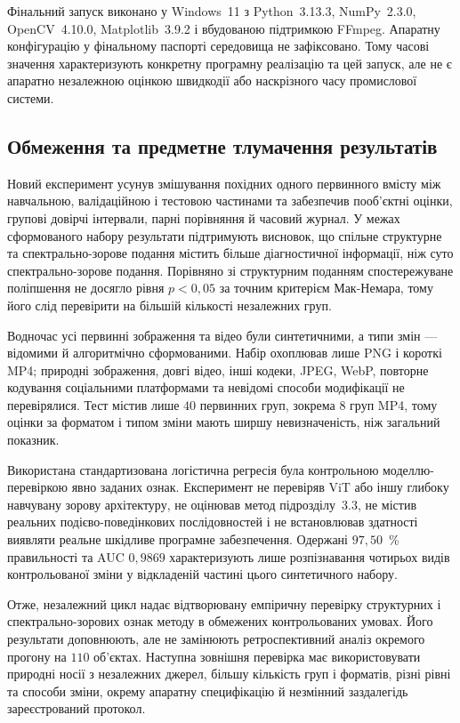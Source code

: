 Фінальний запуск виконано у Windows~11 з Python~3.13.3, NumPy~2.3.0, OpenCV~4.10.0, Matplotlib~3.9.2 і вбудованою підтримкою FFmpeg. Апаратну конфігурацію у фінальному паспорті середовища не зафіксовано. Тому часові значення характеризують конкретну програмну реалізацію та цей запуск, але не є апаратно незалежною оцінкою швидкодії або наскрізного часу промислової системи.

\subsection{Обмеження та предметне тлумачення результатів}
\label{subsec:ch4_ind_svs_limits}

Новий експеримент усунув змішування похідних одного первинного вмісту між навчальною, валідаційною і тестовою частинами та забезпечив пооб'єктні оцінки, групові довірчі інтервали, парні порівняння й часовий журнал. У межах сформованого набору результати підтримують висновок, що спільне структурне та спектрально-зорове подання містить більше діагностичної інформації, ніж суто спектрально-зорове подання. Порівняно зі структурним поданням спостережуване поліпшення не досягло рівня $p<0{,}05$ за точним критерієм Мак-Немара, тому його слід перевірити на більшій кількості незалежних груп.

Водночас усі первинні зображення та відео були синтетичними, а типи змін --- відомими й алгоритмічно сформованими. Набір охоплював лише PNG і короткі MP4; природні зображення, довгі відео, інші кодеки, JPEG, WebP, повторне кодування соціальними платформами та невідомі способи модифікації не перевірялися. Тест містив лише $40$ первинних груп, зокрема $8$ груп MP4, тому оцінки за форматом і типом зміни мають ширшу невизначеність, ніж загальний показник.

Використана стандартизована логістична регресія була контрольною моделлю-перевіркою явно заданих ознак. Експеримент не перевіряв ViT або іншу глибоку навчувану зорову архітектуру, не оцінював метод підрозділу~3.3, не містив реальних подієво-поведінкових послідовностей і не встановлював здатності виявляти реальне шкідливе програмне забезпечення. Одержані $97{,}50$~\% правильності та AUC $0{,}9869$ характеризують лише розпізнавання чотирьох видів контрольованої зміни у відкладеній частині цього синтетичного набору.

Отже, незалежний цикл надає відтворювану емпіричну перевірку структурних і спектрально-зорових ознак методу в обмежених контрольованих умовах. Його результати доповнюють, але не замінюють ретроспективний аналіз окремого прогону на $110$ об'єктах. Наступна зовнішня перевірка має використовувати природні носії з незалежних джерел, більшу кількість груп і форматів, різні рівні та способи зміни, окрему апаратну специфікацію й незмінний заздалегідь зареєстрований протокол.
